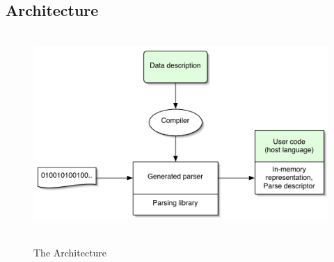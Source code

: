 \subsection{Architecture}

\begin{figure}[tp]
  \includegraphics[height=3in,width=5in]{architecture}
\label{fig:pads-arch}
\caption{The \pads{} Architecture}
\end{figure}
